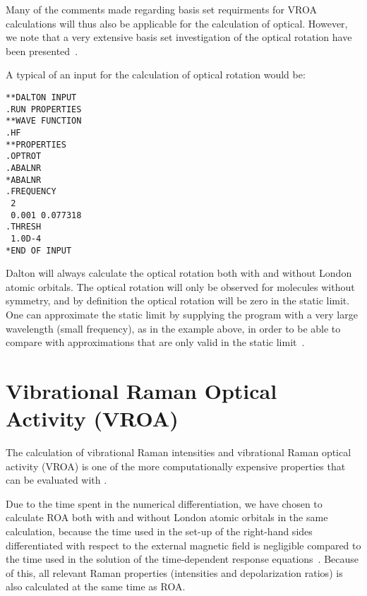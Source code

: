 Many of the comments made regarding basis set requirments for VROA
calculations will thus also be applicable for the calculation of
optical. However, we note that a very extensive basis set
investigation of the optical rotation have been
presented~\cite{jrcmjffjdpjsjpca104}.

A typical of an input for the calculation of optical rotation would
be:

\begin{verbatim}
**DALTON INPUT
.RUN PROPERTIES
**WAVE FUNCTION
.HF
**PROPERTIES
.OPTROT
.ABALNR
*ABALNR
.FREQUENCY
 2
 0.001 0.077318
.THRESH
 1.0D-4
*END OF INPUT
\end{verbatim}

Dalton will always calculate the optical rotation both with and
without London atomic orbitals. The optical rotation will only be
observed for molecules without symmetry, and by definition the optical
rotation will be zero in the static limit. One can approximate the
static limit by supplying the program with a very large wavelength
(small frequency), as in the example above, in order to be able to
compare with approximations that are only valid in the static
limit~\cite{rdacpl87,jrcmjffjdpjsjpca104}. 

\section{Vibrational Raman Optical Activity (VROA)}\label{sec:vroa}

\begin{center}
\end{center}

The calculation of vibrational Raman intensities and vibrational Raman optical
activity (VROA) 
is one of the more computationally expensive properties that can be
evaluated with \siraba .

Due to the time spent in the numerical differentiation, we have chosen
to calculate ROA both with and without London atomic
orbitals in the
same calculation, because the time used in the set-up of the right-hand
sides differentiated
with respect to the external magnetic field is negligible compared to
the time used in the solution of the time-dependent response
equations~\cite{thkrklbpjjofd99}. Because of this,  all relevant Raman
properties (intensities and depolarization ratios) is also calculated
at the same time as ROA.  


